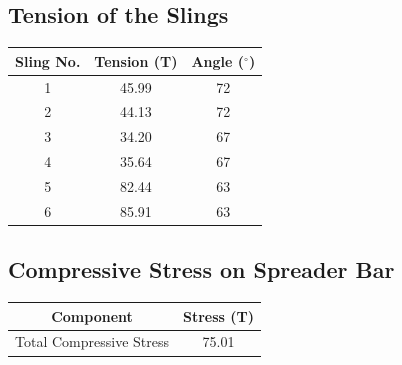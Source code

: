 \documentclass[12pt]{article}
\begin{document}
\subsection*{Tension of the Slings}
\begin{center}
\begin{tabular}{|c|c|c|}
\hline
Sling No. & Tension (T) & Angle ($^\circ$) \\
\hline
1 & 45.99 & 72 \\
2 & 44.13 & 72 \\
3 & 34.20 & 67 \\
4 & 35.64 & 67 \\
5 & 82.44 & 63 \\
6 & 85.91 & 63 \\
\hline
\end{tabular}
\end{center}

\subsection*{Compressive Stress on Spreader Bar}
\begin{center}
\begin{tabular}{|c|c|}
\hline
Component & Stress (T) \\
\hline
Total Compressive Stress & 75.01 \\
\hline
\end{tabular}
\end{center}
\end{document}
